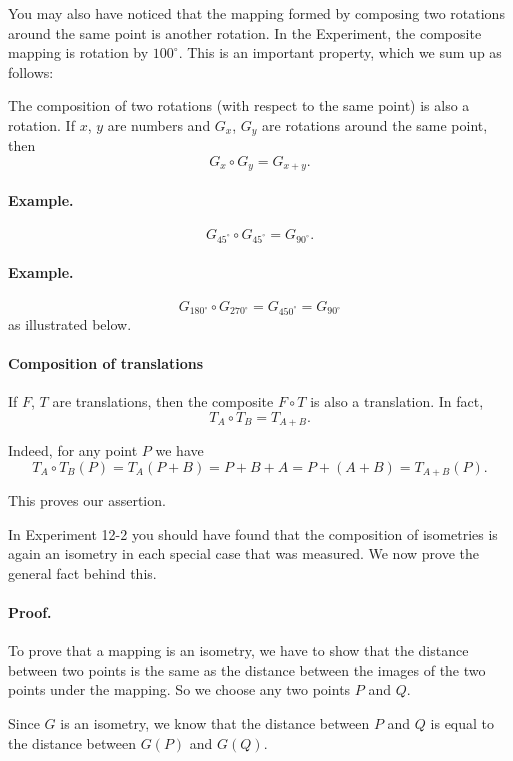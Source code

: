 \documentclass[12pt]{book} %
\begin{document}
\begin{ExerciseList}
You may also have noticed that the mapping formed by composing two rotations around the same point is another rotation. In the Experiment, the composite mapping is rotation by $100^\circ$. This is an important property, which we sum up as follows:

The composition of two rotations (with respect to the same point) is also a rotation. If $x$, $y$ are numbers and $G_x$, $G_y$ are rotations around the same point, then
\[
G_x\circ G_y=G_{x+y}.
\]

\paragraph{Example.}
\[
G_{45^\circ}\circ G_{45^\circ}=G_{90^\circ}.
\]

\paragraph{Example.}
\[
G_{180^\circ}\circ G_{270^\circ}=G_{450^\circ}=G_{90^\circ}
\]
as illustrated below.


\paragraph{Composition of translations}
If $F$, $T$ are translations, then the composite $F\circ T$ is also a translation. In fact,
\[
T_A\circ T_B=T_{A+B}.
\]

Indeed, for any point $P$ we have
\[
T_A\circ T_B(P)=T_A(P+B)=P+B+A=P+(A+B)=T_{A+B}(P).
\]

This proves our assertion.

In Experiment 12-2 you should have found that the composition of isometries is again an isometry in each special case that was measured. We now prove the general fact behind this.


\paragraph{Proof.}
To prove that a mapping is an isometry, we have to show that the distance between two points is the same as the distance between the images of the two points under the mapping. So we choose any two points $P$ and $Q$.

Since $G$ is an isometry, we know that the distance between $P$ and $Q$ is equal to the distance between $G(P)$ and $G(Q)$.


\end{ExerciseList}
\end{document}
